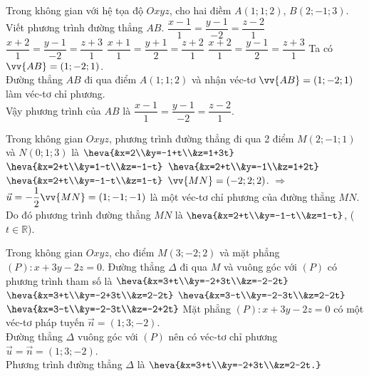 \begin{ex}%
	Trong không gian với hệ tọa độ $O x y z$, cho hai điềm $A(1;1;2)$, $B(2;-1;3)$. Viết phương trình đường thẳng $AB$.
	\choice 
	{\True $\dfrac{x-1}{1}=\dfrac{y-1}{-2}=\dfrac{z-2}{1}$}
	{$\dfrac{x+2}{1}=\dfrac{y-1}{-2}=\dfrac{z+3}{1}$}
	{$\dfrac{x+1}{1}=\dfrac{y+1}{2}=\dfrac{z+2}{1}$}
	{$\dfrac{x+2}{1}=\dfrac{y-1}{2}=\dfrac{z+3}{1}$}
	\loigiai 
	{
Ta có $\vv{AB}=(1;-2;1)$.\\
Đường thẳng $AB$ đi qua điểm $A(1;1;2)$ và nhận véc-tơ $\vv{AB}=(1;-2;1)$ làm véc-tơ chỉ phương.\\
Vậy phương trình của $AB$ là $\dfrac{x-1}{1}=\dfrac{y-1}{-2}=\dfrac{z-2}{1}$.
	}
\end{ex}

\begin{ex}%
Trong không gian $O x y z$, phương trình đường thẳng đi qua 2 điểm $M(2;-1;1)$ và $N(0;1;3)$ là 
\choice 
{$\heva{&x=2\\&y=-1+t\\&z=1+3t}$}
{$\heva{&x=2+t\\&y=1-t\\&z=-1-t}$}
{$\heva{&x=2+t\\&y=-1\\&z=1+2t}$}
{\True $\heva{&x=2+t\\&y=-1-t\\&z=1-t}$}
\loigiai
{
$\vv{M N}=(-2;2;2)$.
$\Rightarrow$ $\vec{u}=-\dfrac{1}{2}\vv{MN}=(1;-1;-1)$ là một véc-tơ chỉ phương của đường thẳng $MN$. Do đó phương trình đường thẳng $MN$ là $\heva{&x=2+t\\&y=-1-t\\&z=1-t}$, ($t\in\mathbb{R}$).
}
\end{ex}

\begin{ex}%
	Trong không gian $O x y z$, cho điểm $M(3;-2;2)$ và mặt phẳng $(P): x+3y-2z=0$. Đường thẳng $\Delta$ đi qua $M$ và vuông góc với $(P)$ có phương trình tham số là 
	\choice 
	{$\heva{&x=3+t\\&y=-2+3t\\&z=-2-2t}$}
	{\True $\heva{&x=3+t\\&y=-2+3t\\&z=2-2t}$}
	{$\heva{&x=3-t\\&y=-2-3t\\&z=2-2t}$}
	{$\heva{&x=3-t\\&y=-2-3t\\&z=-2+2t}$}
					\loigiai 
					{
Mặt phẳng $(P)\colon x+3y-2z=0$ có một véc-tơ pháp tuyến $\vec{n}=(1;3;-2)$.\\
Đường thẳng $\Delta$ vuông góc với $(P)$ nên có véc-tơ chỉ phương $\vec{u}=\vec{n}=(1;3;-2)$.\\
Phương trình đường thẳng $\Delta$ là $\heva{&x=3+t\\&y=-2+3t\\&z=2-2t.}$	
					}
\end{ex}

